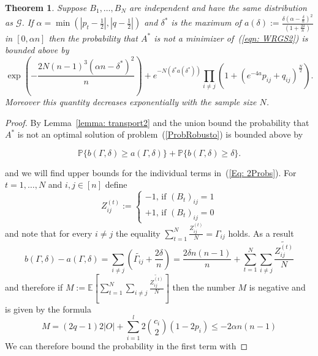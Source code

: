 \documentclass[12pt]{amsart}
\newtheorem{theorem}[lemma]{Theorem}
\theoremstyle{remark}
\newcommand{\PP}{\mathbb{P}}
\newcommand{\EE}{\mathbb{E}}
\newcommand{\grG}{{\mathcal{G}}}
\begin{document}
\begin{theorem} Suppose $B_1,\dots, B_N$ are independent and have the same distribution as $\grG$. If $\alpha = \min (|p_t-\frac{1}{2}|, |q-\frac{1}{2}|)$ and $\delta^*$ is the maximum of $a(\delta):=\frac{\delta\left(\alpha-\frac{\delta}{n}\right)^2}{\left(1+\frac{2\delta}{n}\right)}$ in $[0,\alpha n]$ then the probability that $A^*$ is not a minimizer of~(\ref{eqn: WRGS2}) is bounded above by
\[ \exp\left(-\frac{2N(n-1)^3(\alpha n-\delta^*)^2}{n}\right) + e^{-N\left(\delta^* a(\delta^*)\right)}\prod_{i\neq j}\left(1+ (e^{-4a}p_{ij}+q_{ij})^{\frac{N}{2}}\right).\] 
Moreover this quantity decreases exponentially with the sample size $N$.
\end{theorem}
\begin{proof} By Lemma~\ref{lemma: transport2} and the union bound the probability that $A^*$ is not an optimal solution of problem~(\ref{ProbRobusto}) is bounded above by

\begin{equation}\label{Eq: 2Probs}
\PP\{b(\Gamma,\delta)\geq a(\Gamma,\delta)\}+\PP\{b(\Gamma,\delta)\geq \delta\}.
\end{equation}

and we will find upper bounds for the individual terms in~(\ref{Eq: 2Probs}). 
For $t=1,\dots, N$ and $i,j\in [n]$ define 
\[Z^{(t)}_{ij}:=\begin{cases}
-1\text{, if $(B_t)_{ij}=1$}\\
+1\text{, if $(B_t)_{ij}=0$}
\end{cases}\]
and note that for every $i\neq j$ the equality $\sum_{t=1}^N\frac{Z_{ij}^{(t)}}{N} = \Gamma_{ij}$ holds. As a result
\[b(\Gamma,\delta)-a(\Gamma,\delta) = \sum_{i\neq j} \left(\widetilde{\Gamma_{ij}}+\frac{2\delta}{n}\right)= \frac{2\delta n(n-1)}{n} + \sum_{t=1}^N \sum_{i\neq j} \frac{\widetilde{Z^{(t)}_{ij}}}{N}\]
and therefore if $M:=\EE\left[\sum_{t=1}^N \sum_{i\neq j} \frac{\widetilde{Z^{(t)}_{ij}}}{N}\right]$ then the number $M$ is negative and is given by the formula
\[M=(2q-1)2|O|+\sum_{i=1}^l 2\binom{c_i}{2} (1-2p_i)\leq -2\alpha n(n-1)\]  
We can therefore bound the probability in the first term with
 

\end{proof}
\end{document}
